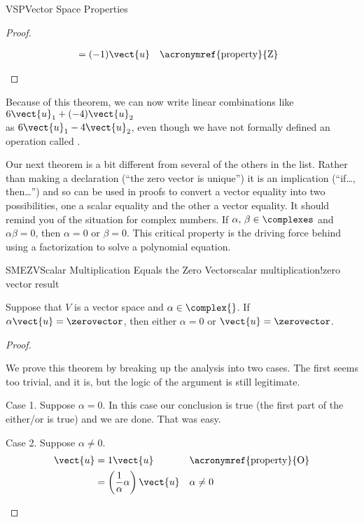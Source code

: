 \begin{subsect}{VSP}{Vector Space Properties}
\begin{proof}
\begin{para}
\begin{align*}
&=(-1)\vect{u}&&\text{\acronymref{property}{Z}}
%
\end{align*}
\end{para}
%
\end{proof}
%
\begin{para}Because of this theorem, we can now write linear combinations like $6\vect{u}_1+(-4)\vect{u}_2$\\
as $6\vect{u}_1-4\vect{u}_2$, even though we have not formally defined an operation called .\end{para}
%
\begin{para}Our next theorem is a bit different from several of the others in the list.  Rather than making a declaration (``the zero vector is unique'') it is an implication (``if\dots, then\dots'') and so can be used in proofs to convert a vector equality into two possibilities, one a scalar equality and the other a vector equality.  It should remind you of the situation for complex numbers.  If $\alpha,\,\beta\in\complexes$ and $\alpha\beta=0$, then $\alpha=0$ or $\beta=0$.  This critical property is the driving force behind using a factorization to solve a polynomial equation.\end{para}
%
\begin{theorem}{SMEZV}{Scalar Multiplication Equals the Zero Vector}{scalar multiplication!zero vector result}
%
\begin{para}Suppose that $V$ is a vector space and $\alpha\in\complex{\null}$.  If $\alpha\vect{u}=\zerovector$, then either $\alpha=0$ or $\vect{u}=\zerovector$.\end{para}
%
\end{theorem}
%
\begin{proof}
\begin{para}We prove this theorem by breaking up the analysis into two cases.  The first seems too trivial, and it is, but the logic of the argument is still legitimate.\end{para}
%
\begin{para}Case 1.  Suppose $\alpha=0$.  In this case our conclusion is true (the first part of the either/or is true) and we are done.  That was easy.\end{para}
%
\begin{para}Case 2.  Suppose $\alpha\neq 0$.
\begin{align*}
\vect{u}
&=1\vect{u}
&&\text{\acronymref{property}{O}}\\
%
&=\left(\frac{1}{\alpha}\alpha\right)\vect{u}
&&\alpha\neq 0\\

\end{align*}
\end{para}
\end{proof}
\end{subsect}
